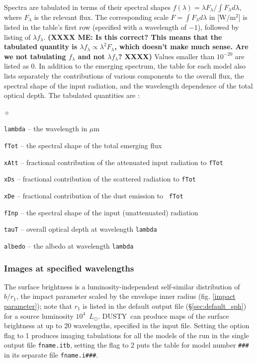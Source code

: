 \documentclass[11pt]{article}
\def\D    {{\sf DUSTY}}
\def\E#1{\hbox{$10^{#1}$}}
\def\mic    {\hbox{$\mu$m}}
\def\Lo     {\hbox{$L_{\odot}$}}
\begin{document}
Spectra are tabulated in terms of their spectral shapes $f(\lambda) = \lambda
F_\lambda/\int\!F_\lambda d\lambda$, where $F_\lambda$ is the relevant flux.
The corresponding  scale $F = \int\!F_\lambda d\lambda$ in [W/m$^2$] is listed
in the table's first row (specified with a wavelength of $-1$), followed by
listing of $\lambda f_\lambda$. \textbf{(XXXX ME: Is this correct?  This means
that the tabulated quantity is $\lambda f_\lambda \propto \lambda^2F_\lambda$,
which doesn't make much sense. Are we not tabulating $f_\lambda$ and not
$\lambda f_\lambda$? XXXX)} Values smaller than \E{-20} are listed as 0. In
addition to the emerging spectrum, the table for each model also lists
separately the contributions of various components to the overall flux, the
spectral shape of the input radiation, and the wavelength dependence of the
total optical depth. The tabulated quantities are :

\begin{list}{$\diamond$}{}
\item {\tt lambda} -- the wavelength in \mic
\item {\tt fTot} -- the spectral shape of the total emerging flux
\item{\tt xAtt} -- fractional contribution of the attenuated input
  radiation to {\tt fTot}
\item{\tt xDs} -- fractional contribution of the scattered radiation
  to {\tt fTot}
\item{\tt xDe} -- fractional contribution of the dust emission to {\tt
    fTot}
\item{\tt fInp} -- the spectral shape of the input (unattenuated)
  radiation
\item{\tt tauT} -- overall optical depth at wavelength {\tt lambda}
\item{\tt albedo} -- the albedo at wavelength {\tt lambda}
\end{list}

\subsubsection{Images at specified wavelengths}
\label{sec:images_sph}

The surface brightness is a luminosity-independent self-similar
distribution \cite{IE96a} of $b/r_1$, the impact parameter scaled by
the envelope inner radius (fig. \ref{impact parameter}); note that
$r_1$ is listed in the default output file (\S\ref{sec:default_sph})
for a source luminosity \E4~\Lo. \D\ can produce maps of the surface
brightness at up to 20 wavelengths, specified in the input
file. Setting the option flag to 1 produces imaging tabulations for
all the models of the run in the single output file {\tt fname.itb},
setting the flag to 2 puts the table for model number {\tt \#\#\#} in
its separate file {\tt fname.i\#\#\#}.
\end{document}
